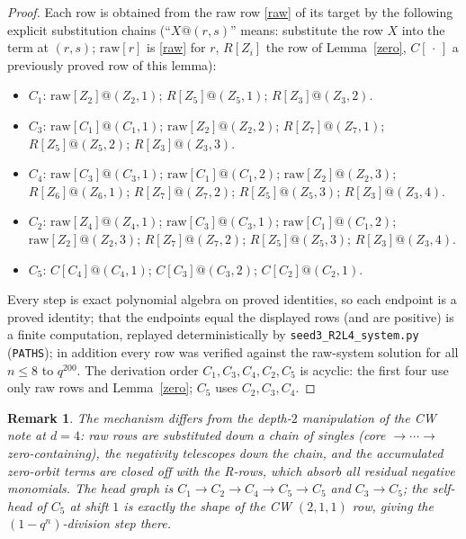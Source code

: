 \documentclass[11pt]{article}
\newtheorem{remark}[theorem]{Remark}
\begin{document}
\begin{proof}
Each row is obtained from the raw row \eqref{raw} of its target by the following
explicit substitution chains (``$X@ (r,s)$'' means: substitute the row $X$ into
the term at $(r,s)$; $\mathrm{raw}[r]$ is \eqref{raw} for $r$, $R[Z_i]$ the row of
Lemma~\ref{zero}, $C[\,\cdot\,]$ a previously proved row of this lemma):
\begin{itemize}
\item $C_1$: $\mathrm{raw}[Z_2]@ (Z_2,1)$;\; $R[Z_5]@ (Z_5,1)$;\;
      $R[Z_3]@ (Z_3,2)$.
\item $C_3$: $\mathrm{raw}[C_1]@ (C_1,1)$;\; $\mathrm{raw}[Z_2]@ (Z_2,2)$;\;
      $R[Z_7]@ (Z_7,1)$;\; $R[Z_5]@ (Z_5,2)$;\; $R[Z_3]@ (Z_3,3)$.
\item $C_4$: $\mathrm{raw}[C_3]@ (C_3,1)$;\; $\mathrm{raw}[C_1]@ (C_1,2)$;\;
      $\mathrm{raw}[Z_2]@ (Z_2,3)$;\; $R[Z_6]@ (Z_6,1)$;\; $R[Z_7]@ (Z_7,2)$;\;
      $R[Z_5]@ (Z_5,3)$;\; $R[Z_3]@ (Z_3,4)$.
\item $C_2$: $\mathrm{raw}[Z_4]@ (Z_4,1)$;\; $\mathrm{raw}[C_3]@ (C_3,1)$;\;
      $\mathrm{raw}[C_1]@ (C_1,2)$;\; $\mathrm{raw}[Z_2]@ (Z_2,3)$;\;
      $R[Z_7]@ (Z_7,2)$;\; $R[Z_5]@ (Z_5,3)$;\; $R[Z_3]@ (Z_3,4)$.
\item $C_5$: $C[C_4]@ (C_4,1)$;\; $C[C_3]@ (C_3,2)$;\; $C[C_2]@ (C_2,1)$.
\end{itemize}
Every step is exact polynomial algebra on proved identities, so each endpoint is a
proved identity; that the endpoints equal the displayed rows (and are positive) is
a finite computation, replayed deterministically by
\texttt{seed3\_R2L4\_system.py} (\texttt{PATHS}); in addition every row was
verified against the raw-system solution for all $n\le 8$ to $q^{200}$.
The derivation order $C_1,C_3,C_4,C_2,C_5$ is acyclic: the first four use only raw
rows and Lemma~\ref{zero}; $C_5$ uses $C_2,C_3,C_4$.
\end{proof}

\begin{remark}
The mechanism differs from the depth-$2$ manipulation of the CW note at $d=4$:
raw rows are substituted down a chain of singles (core $\to\cdots\to$
zero-containing), the negativity telescopes down the chain, and the accumulated
zero-orbit terms are closed off with the R-rows, which absorb all residual
negative monomials. The head graph is $C_1\to C_2\to C_4\to C_5\to C_5$ and
$C_3\to C_5$; the self-head of $C_5$ at shift $1$ is exactly the shape of the CW
$(2,1,1)$ row, giving the $(1-q^{n})$-division step there.
\end{remark}
\end{document}
